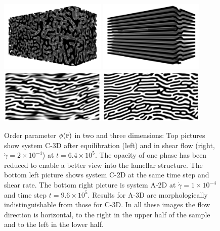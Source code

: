\documentclass[8.5pt,twoside,twocolumn]{article}
\newcommand{\e}[1]{\times10^{#1}}
\begin{document}
\begin{figure}[htp!]
\centering
\includegraphics[angle=0,width=0.45\textwidth]{phi_run1002_320k.png}
\includegraphics[angle=0,width=0.45\textwidth]{phi_run1002_640k.png}
\includegraphics[angle=0,width=0.45\textwidth]{phi_run1001_640k.png}
\includegraphics[angle=0,width=0.45\textwidth]{phi_run1003_960k.png}
\caption{Order parameter $\phi({\bf r})$ in two and three dimensions: Top pictures show system C-3D after equilibration (left) and in shear flow (right, $\dot{\gamma}=2\times10^{-4}$) at $t=6.4\e{5}$. The opacity of one phase has been reduced to enable a better view into the lamellar structure. The bottom left picture shows system C-2D at the same time step and shear rate. The bottom right picture is system A-2D at $\dot{\gamma}=1\times10^{-4}$ and time step $t=9.6\e{5}$. Results for A-3D are morphologically indistinguishable from those for C-3D. In all these images the flow direction is horizontal, to the right in the upper half of the sample and to the left in the lower half.} 
\label{fig10}
\end{figure}
\end{document}
